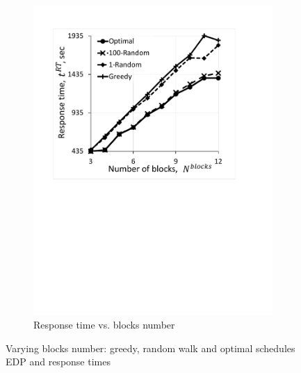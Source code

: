 \begin{figure}
\begin{subfigure}{0.4\textwidth}
        \includegraphics[width=\linewidth]{figs/RTVsBlocks.pdf}
        \caption{Response time vs. blocks number}
        \label{fig:RTVsBlocks}
    \end{subfigure}
     \caption{Varying blocks number: greedy, random walk and optimal schedules EDP and response times}
       \label{fig:varyingBlocks}
\end{figure}

